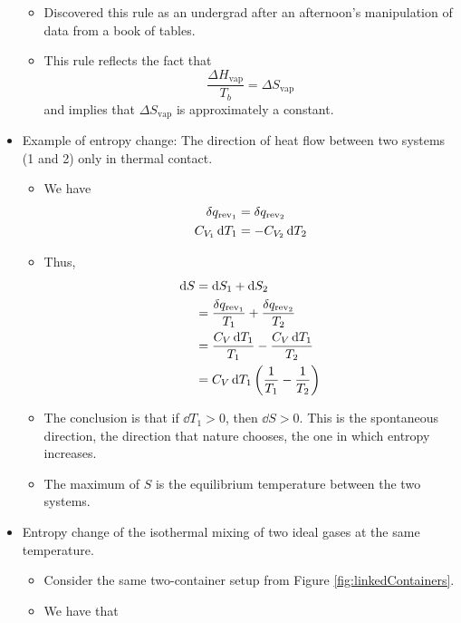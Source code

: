 \documentclass[../notes.tex]{subfiles}
\begin{document}
\begin{itemize}
    \begin{itemize}
        \item Discovered this rule as an undergrad after an afternoon's manipulation of data from a book of tables.
        \item This rule reflects the fact that
        \begin{equation*}
            \frac{\Delta H_\text{vap}}{T_b} = \Delta S_\text{vap}
        \end{equation*}
        and implies that $\Delta S_\text{vap}$ is approximately a constant.
    \end{itemize}
    \item Example of entropy change: The direction of heat flow between two systems (1 and 2) only in thermal contact.
    \begin{itemize}
        \item We have
        \begin{align*}
            \var{q_{\text{rev}_1}} &= \var{q_{\text{rev}_2}}\\
            C_{V_1}\dd{T_1} &= -C_{V_2}\dd{T_2}
        \end{align*}
        \item Thus,
        \begin{align*}
            \dd{S} &= \dd{S_1}+\dd{S_2}\\
            &= \frac{\var{q_{\text{rev}_1}}}{T_1}+\frac{\var{q_{\text{rev}_2}}}{T_2}\\
            &= \frac{C_V\dd{T_1}}{T_1}-\frac{C_V\dd{T_1}}{T_2}\\
            &= C_V\dd{T_1}\left( \frac{1}{T_1}-\frac{1}{T_2} \right)
        \end{align*}
        \item The conclusion is that if $\dd{T_1}>0$, then $\dd{S}>0$. This is the spontaneous direction, the direction that nature chooses, the one in which entropy increases.
        \item The maximum of $S$ is the equilibrium temperature between the two systems.
    \end{itemize}
    \item Entropy change of the isothermal mixing of two ideal gases at the same temperature.
    \begin{itemize}
        \item Consider the same two-container setup from Figure \ref{fig:linkedContainers}.
        \item We have that
        \begin{align*}

\end{align*}
\end{itemize}
\end{itemize}
\end{document}
